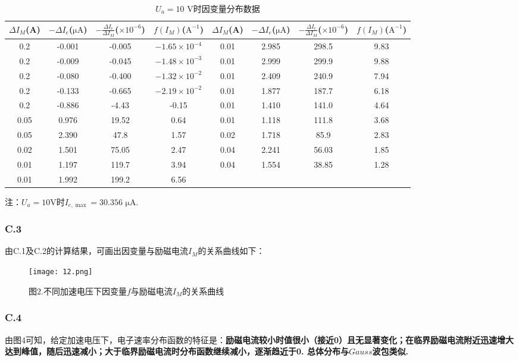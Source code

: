 \documentclass{ctexart}
\begin{document}
  \begin{table}[H]
    \centering
    \caption{$U_a=10$ V时因变量分布数据}\vspace{0.3em} 
    \begin{tabular}{cccc|cccc}
    \toprule
     $\Delta I_M$(A)& $-\Delta I_e$($\mathrm{\mu A}$)& $-\frac{\Delta I_e}{\Delta I_M}$($\times 10^{-6}$)& $f(I_M)$($\mathrm{A^{-1}}$)& 
     $\Delta I_M$(A)& $-\Delta I_e$($\mathrm{\mu A}$)& $-\frac{\Delta I_e}{\Delta I_M}$($\times 10^{-6}$)& $f(I_M)$($\mathrm{A^{-1}}$)\\
    \midrule
    0.2& -0.001& -0.005& $-1.65\times 10^{-4}$&        0.01& 2.985& 298.5   & 9.83\\
    0.2& -0.009& -0.045& $-1.48\times 10^{-3}$&        0.01& 2.999& 299.9   & 9.88\\
    0.2& -0.080& -0.400& $-1.32\times 10^{-2}$&        0.01& 2.409& 240.9   & 7.94\\
    0.2& -0.133& -0.665& $-2.19\times 10^{-2}$&        0.01& 1.877& 187.7   & 6.18\\
    0.2& -0.886& -4.43 & -0.15&                       0.01& 1.410& 141.0   & 4.64\\
    0.05& 0.976& 19.52 & 0.64&                        0.01& 1.118& 111.8   & 3.68\\
    0.05& 2.390& 47.8  & 1.57&                        0.02& 1.718& 85.9    & 2.83\\
    0.02& 1.501& 75.05&  2.47&                        0.04& 2.241& 56.03   & 1.85\\
    0.01& 1.197& 119.7&  3.94&                        0.04& 1.554& 38.85   & 1.28\\
    0.01& 1.992& 199.2&  6.56&                     & & & \\
    \bottomrule
    \end{tabular}
    \end{table}
    \noindent 注：$U_a=10$V时$I_{e,\max}=30.356$  $\mathrm{\mu A}$.
\clearpage
\subsubsection*{C.3}
\noindent 由C.1及C.2的计算结果，可画出因变量与励磁电流$I_M$的关系曲线如下：
\begin{figure}[H]
  \centering
   \texttt{[image: 12.png]}
   \caption*{图$2.$不同加速电压下因变量$f$与励磁电流$I_M$的关系曲线}
 \end{figure}
\subsubsection*{C.4}
\noindent 由图4可知，给定加速电压下，电子速率分布函数的特征是：\textbf{励磁电流较小时值很小（接近0）且无显著变化；在临界励磁电流附近迅速增大达到峰值，随后迅速减小；大于临界励磁电流时分布函数继续减小，逐渐趋近于0. 总体分布与$Gauss$波包类似.}\\
\end{document}
